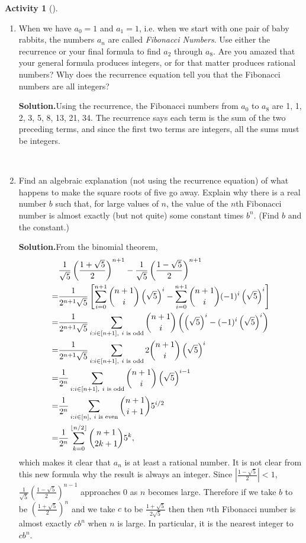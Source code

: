 \documentclass[10pt,]{book}
\theoremstyle{plain}
\theoremstyle{definition}
\newtheorem{activity}[project]{Activity}
\numberwithin{equation}{chapter}
\newcommand{\lt}{<}
\newcommand{\amp}{&}
\begin{document}
\begin{activity}[]
\begin{enumerate}[label=(\alph*)]
~\par
\item When we have \(a_0=1\) and \(a_1=1\), i.e. when we start with one pair of baby rabbits, the numbers \(a_n\) are called \emph{Fibonacci Numbers}.  Use either the recurrence or your final formula to find \(a_2\) through \(a_8\).  Are you amazed that your general formula produces integers, or for that matter produces rational numbers?  Why does the recurrence equation tell you that the Fibonacci numbers are all integers?%
\par\medskip\noindent%
\textbf{Solution.}\quad Using the recurrence, the Fibonacci numbers from \(a_0\) to \(a_8\) are 1, 1, 2, 3, 5, 8, 13, 21, 34. The recurrence says each term is the sum of the two preceding terms, and since the first two terms are integers, all the sums must be integers.%

~\par
\item Find an algebraic explanation (not using the recurrence equation) of what happens to make the square roots of five go away. Explain why there is a real number \(b\) such that, for large values of \(n\), the value of the \(n\)th Fibonacci number is almost exactly (but not quite) some constant times \(b^n\).  (Find \(b\) and the constant.)%
\par\medskip\noindent%
\textbf{Solution.}\quad From the binomial theorem,%
\begin{align*}
\amp \frac{1}{\sqrt{5}}\left(\frac{1+\sqrt{5}}{   2}\right)^{n+1}- \frac{1}{\sqrt{5}}\left(\frac{1-\sqrt{5}}{2}\right)^{n+1}\\
=\amp
\frac{1}{2^{n+1}\sqrt{5}}\left[\sum_{i=0}^{n+1}\binom{n+1}{i}\left(\sqrt{5}\right)^i -\sum_{i=0}^{n+1} \binom{n+1}{i}(-1)^i\left(\sqrt{5}\right)^i\right]\\
=\amp \frac{1}{2^{n+1}\sqrt{5}}\sum_{i:i\in
[n+1],\ i\mbox{\scriptsize~is odd} }\binom{n+1}{i}\left(\left(\sqrt{5}\right)^i
-(-1)^i\left(\sqrt{5}\right)^i\right)\\
=\amp \frac{1}{2^{n+1}\sqrt{5}}\sum_{i:i\in[n+1],\ i\mbox{\scriptsize~is
odd} }  2\binom{n+1}{i}\left(\sqrt{5}\right)^i\\
=\amp \frac{1}{2^{n}}\sum_{i:i\in[n+1],\ i\mbox{\scriptsize~is
odd} }  \binom{n+1}{i}\left(\sqrt{5}\right)^{i-1}\\
=\amp \frac{1}{2^{n}}\sum_{i:i\in[n],\ i\mbox{\scriptsize~is
even} }  \binom{n+1}{i+1}5^{i/2}\\
=\amp \frac{1}{2^n}\sum_{k=0}^{\lfloor n/2 \rfloor}\binom{n+1}{2k+1}5^k,
\end{align*}
which makes it clear that \(a_n\) is at least a rational number. It is not clear from this new formula why the result is always an integer. Since \(\left|\frac{1-\sqrt{5}}{2}\right|\lt 1\), \(\frac{1}{\sqrt{5}}\left(\frac{1-\sqrt{5}}{2}\right)^{n-1}\) approaches 0 as \(n\) becomes large. Therefore if we take \(b\) to be \(\left(\frac{1+\sqrt{5}}{2}\right)^n\) and we take \(c\) to be \(\frac{1+\sqrt{5}}{2\sqrt{5}}\) then then \(n\)th Fibonacci number is almost exactly \(cb^n\) when \(n\) is large. In particular, it is the nearest integer to \(cb^n\).%


\end{enumerate}
\end{activity}
\end{document}

